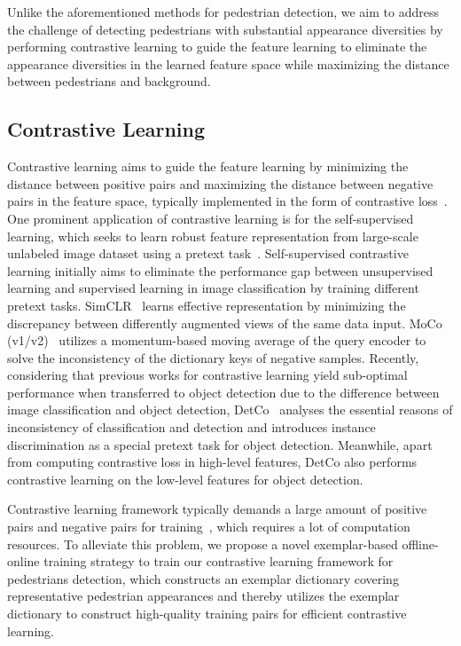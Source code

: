 \documentclass[journal]{IEEEtran}
\begin{document}
Unlike the aforementioned methods for pedestrian detection, we aim to address the challenge of detecting pedestrians with substantial appearance diversities by performing contrastive learning to guide the feature learning to eliminate the appearance diversities in the learned feature space while maximizing the distance between pedestrians and background.

\subsection{Contrastive Learning}
Contrastive learning aims to guide the feature learning by minimizing the distance between positive pairs and maximizing the distance between negative pairs in the feature space, typically implemented in the form of contrastive loss~\cite{hadsell2006dimensionality,he2020momentum}. One prominent application of contrastive learning is for the self-supervised learning, which seeks to learn robust feature representation from large-scale unlabeled image dataset using a pretext task~\cite{he2020momentum, chen2020simple}.
Self-supervised contrastive learning initially aims to eliminate the performance gap between unsupervised learning and supervised learning in image classification by training different pretext tasks. SimCLR~\cite{chen2020simple} learns effective representation by minimizing the discrepancy between differently augmented views of the same data input. MoCo (v1/v2)~\cite{he2020momentum,chen2020improved} utilizes a momentum-based moving average of the query
encoder to solve the inconsistency of the dictionary keys of negative samples.
Recently, considering that previous works for contrastive learning yield sub-optimal performance when transferred to object detection due to the difference between image classification and object detection, DetCo~\cite{xie2021detco} analyses the essential reasons of inconsistency of classification and detection and introduces instance discrimination as a special pretext task for object detection. Meanwhile, apart from computing contrastive loss in high-level features, DetCo also performs contrastive learning on the low-level features for object detection. 

Contrastive learning framework typically demands a large amount of positive pairs and negative pairs for training~\cite{chen2020simple,chen2020big, he2020momentum,tian2019contrastive,wu2018unsupervised}, which requires a lot of computation resources. To alleviate this problem, we propose a novel exemplar-based offline-online training strategy to train our contrastive learning framework for pedestrians detection, which constructs an exemplar dictionary covering representative pedestrian appearances and thereby utilizes the exemplar dictionary to construct high-quality training pairs for efficient contrastive learning.
\vspace{-4pt}
\end{document}

